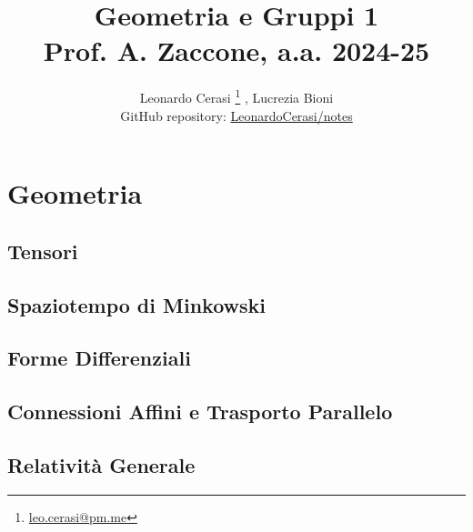 \documentclass[a4paper, 12pt, openany]{book}
\author{Leonardo Cerasi%
	\thanks{\scriptsize\href{mailto:leonardo.cerasi@studenti.unimi.it}{leo.cerasi@pm.me}}%
	, Lucrezia Bioni\\
	\small GitHub repository: \href{https://github.com/LeonardoCerasi/notes}{LeonardoCerasi/notes}}
\title{\Huge\textbf{Geometria e Gruppi 1} \\ \large Prof. A. Zaccone, a.a. 2024-25}
\begin{document}
\frontmatter

\maketitle

\tableofcontents
\pagestyle{indice}

\mainmatter

\part{Geometria}
\pagestyle{body}

\chapter{Tensori}


\chapter{Spaziotempo di Minkowski}


\chapter{Forme Differenziali}


\chapter{Connessioni Affini e Trasporto Parallelo}


\chapter{Relatività Generale}

\end{document}
